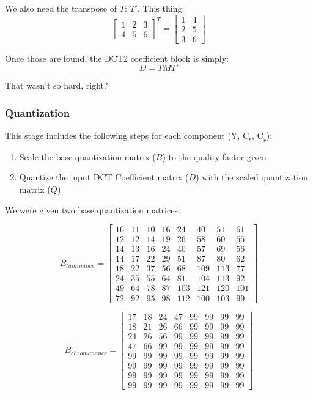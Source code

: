 \documentclass{article}
\begin{document}
We also need the transpose of $T$: $T'$.  This thing:
\[
\begin{bmatrix}
1 & 2 & 3 \\
4 & 5 & 6
\end{bmatrix}^{T}
=
\begin{bmatrix}
1 & 4 \\
2 & 5 \\
3 & 6
\end{bmatrix}
\]

Once those are found, the DCT2 coefficient block is simply:
\[ D = T M T' \]

That wasn't so hard, right?

\subsubsection{Quantization}

This stage includes the following steps for each component ($\text{Y, C}_{b}\text{, C}_{r}$):
\begin{enumerate}
	\item Scale the base quantization matrix ($B$) to the quality factor given
	\item Quantize the input DCT Coefficient matrix ($D$) with the scaled quantization matrix ($Q$)
\end{enumerate}

We were given two base quantization matrices:

\[B_{luminance} =
\begin{bmatrix}
16 & 11 & 10 & 16 & 24 & 40 & 51 & 61 \\
12 & 12 & 14 & 19 & 26 & 58 & 60 & 55 \\
14 & 13 & 16 & 24 & 40 & 57 & 69 & 56 \\
14 & 17 & 22 & 29 & 51 & 87 & 80 & 62 \\
18 & 22 & 37 & 56 & 68 & 109 & 113 & 77 \\
24 & 35 & 55 & 64 & 81 & 104 & 113 & 92 \\
49 & 64 & 78 & 87 & 103 & 121 & 120 & 101 \\
72 & 92 & 95 & 98 & 112 & 100 & 103 & 99
\end{bmatrix}
\]

\[B_{chromanance} =
\begin{bmatrix}
17 & 18 & 24 & 47 & 99 & 99 & 99 & 99 \\
18 & 21 & 26 & 66 & 99 & 99 & 99 & 99 \\
24 & 26 & 56 & 99 & 99 & 99 & 99 & 99 \\
47 & 66 & 99 & 99 & 99 & 99 & 99 & 99 \\
99 & 99 & 99 & 99 & 99 & 99 & 99 & 99 \\
99 & 99 & 99 & 99 & 99 & 99 & 99 & 99 \\
99 & 99 & 99 & 99 & 99 & 99 & 99 & 99 \\
99 & 99 & 99 & 99 & 99 & 99 & 99 & 99
\end{bmatrix}
\]
\end{document}
